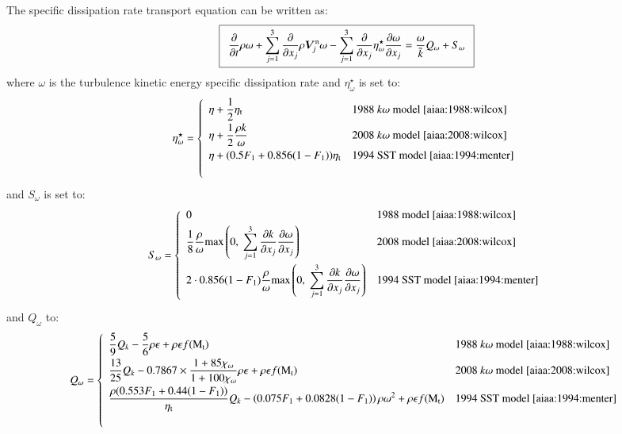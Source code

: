 \documentclass{warpdoc}
\newcommand\frameeqn[1]{\fbox{$\displaystyle #1$}}
\newcommand{\alb}{\vspace{0.1cm}\\} %
\newcommand{\mfd}{\displaystyle}
\newcommand{\visc}{\eta}
\renewcommand{\vec}[1]{\bm{#1}}
\begin{document}
The specific dissipation rate transport equation can be written as:
%
\begin{equation}
\frameeqn{
 \begin{array}{r}
         \mfd \frac{\partial }{\partial t} \rho \omega
        +\mfd\sum_{j=1}^{3}
          \frac{\partial }{\partial x_j} \rho \vec{V}^{\rm n}_j \omega
        -\sum_{j=1}^3 \frac{\partial }{\partial x_j} \visc_\omega^\star \frac{\partial \omega}{\partial x_j}
=  \frac{\omega}{\wtilde{k}} Q_{\omega} + S_{\omega} 
 \end{array}
}
\label{eqn:omega}
\end{equation}
%
where $\omega$ is the turbulence kinetic energy specific dissipation rate and $\visc_\omega^\star$ is set to:
%
\begin{equation}
\visc_\omega^\star=\left\{
\begin{array}{ll}\mfd
\visc +\frac{1}{2}\visc_{\rm t} & \textrm{1988~$k\omega$~model~\cite{aiaa:1988:wilcox}}\alb\mfd
\visc +\frac{1}{2}\frac{\rho k}{\omega} & \textrm{2008~$k\omega$~model~\cite{aiaa:2008:wilcox}}\alb\mfd
\visc + (0.5 F_1 + 0.856(1-F_1)) \visc_{\rm t}& \textrm{1994~SST~model~\cite{aiaa:1994:menter}}\alb\mfd
\end{array}
\right.
\end{equation}
%
and $S_{\omega}$  is set to:
%
\begin{equation}
S_{\omega}= \left\{
\begin{array}{ll}\mfd
0 & \textrm{1988~model~\cite{aiaa:1988:wilcox}}\alb\mfd
\frac{1}{8}\frac{\rho}{\omega}{\rm max}\left(0,~\sum_{j=1}^3\frac{\partial k}{\partial x_j}\frac{\partial \omega}{\partial x_j}\right) & \textrm{2008~model~\cite{aiaa:2008:wilcox}}\alb\mfd
2\cdot 0.856 (1-F_1)\frac{\rho}{\omega}{\rm max}\left(0,~\sum_{j=1}^3\frac{\partial k}{\partial x_j}\frac{\partial \omega}{\partial x_j}\right) & \textrm{1994~SST~model~\cite{aiaa:1994:menter}}\alb
\end{array}
\right.
\end{equation}
%
and $Q_{\omega}$ to:
%
\begin{equation}
Q_{\omega}= \left\{
\begin{array}{ll}\mfd
\frac{5}{9}  Q_k - \frac{5}{6} \rho \epsilon +\rho \epsilon f({\rm M}_{\rm t}) & \textrm{1988~$k\omega$~model~\cite{aiaa:1988:wilcox}}\alb\mfd
\frac{13}{25}  Q_k - 0.7867 \times \frac{1+ 85 \chi_\omega}{1+100 \chi_\omega} \rho \epsilon +\rho \epsilon f({\rm M}_{\rm t}) & \textrm{2008~$k\omega$~model~\cite{aiaa:2008:wilcox}}\alb\mfd
\frac{\rho (0.553 F_1  + 0.44 (1-F_1))}{\visc_{\rm t}} Q_k
                 -\left(0.075 F_1 + 0.0828 (1-F_1)\right) \rho \omega^2 +\rho \epsilon f({\rm M}_{\rm t}) & \textrm{1994~SST~model~\cite{aiaa:1994:menter}}\alb\mfd
\end{array}
\right.
\end{equation}
\end{document}
